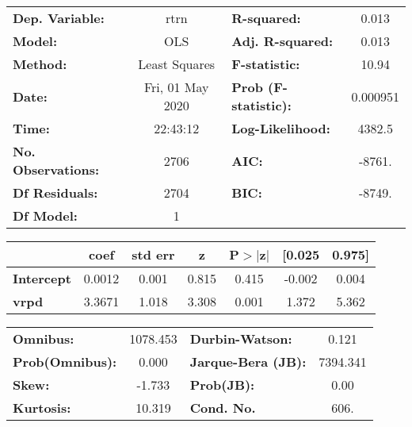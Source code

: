 \begin{center}
\begin{tabular}{lclc}
\toprule
\textbf{Dep. Variable:}    &       rtrn       & \textbf{  R-squared:         } &     0.013   \\
\textbf{Model:}            &       OLS        & \textbf{  Adj. R-squared:    } &     0.013   \\
\textbf{Method:}           &  Least Squares   & \textbf{  F-statistic:       } &     10.94   \\
\textbf{Date:}             & Fri, 01 May 2020 & \textbf{  Prob (F-statistic):} &  0.000951   \\
\textbf{Time:}             &     22:43:12     & \textbf{  Log-Likelihood:    } &    4382.5   \\
\textbf{No. Observations:} &        2706      & \textbf{  AIC:               } &    -8761.   \\
\textbf{Df Residuals:}     &        2704      & \textbf{  BIC:               } &    -8749.   \\
\textbf{Df Model:}         &           1      & \textbf{                     } &             \\
\bottomrule
\end{tabular}
\begin{tabular}{lcccccc}
                   & \textbf{coef} & \textbf{std err} & \textbf{z} & \textbf{P$> |$z$|$} & \textbf{[0.025} & \textbf{0.975]}  \\
\midrule
\textbf{Intercept} &       0.0012  &        0.001     &     0.815  &         0.415        &       -0.002    &        0.004     \\
\textbf{vrpd}      &       3.3671  &        1.018     &     3.308  &         0.001        &        1.372    &        5.362     \\
\bottomrule
\end{tabular}
\begin{tabular}{lclc}
\textbf{Omnibus:}       & 1078.453 & \textbf{  Durbin-Watson:     } &    0.121  \\
\textbf{Prob(Omnibus):} &   0.000  & \textbf{  Jarque-Bera (JB):  } & 7394.341  \\
\textbf{Skew:}          &  -1.733  & \textbf{  Prob(JB):          } &     0.00  \\
\textbf{Kurtosis:}      &  10.319  & \textbf{  Cond. No.          } &     606.  \\
\bottomrule
\end{tabular}
\end{center}

